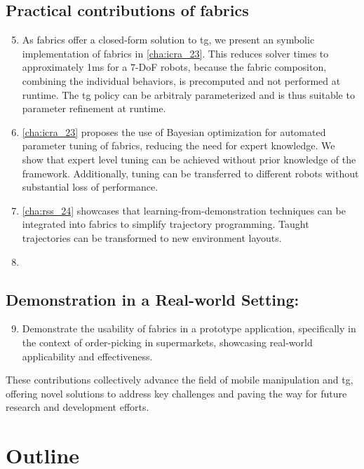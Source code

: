 \subsection{Practical contributions of \ac{fabrics}}
\begin{enumerate}
  \setcounter{enumi}{4}
  \item As \ac{fabrics} offer a closed-form solution to
    \ac{tg}, we present an symbolic implementation of
    \ac{fabrics} in \cref{cha:icra_23}. This reduces
    solver times to approximately 1ms for a 7-DoF robots, 
    because the fabric compositon, combining
    the individual behaviors, is precomputed and not
    performed at runtime. The \ac{tg} policy can be
    arbitraly parameterized and is thus suitable to
    parameter refinement at runtime.
  \item \cref{cha:icra_23} proposes the use of Bayesian optimization for
    automated parameter tuning of \ac{fabrics},
    reducing the need for expert knowledge. We show that
    expert level tuning can be achieved without prior
    knowledge of the framework. Additionally, tuning can
    be transferred to different robots without substantial
    loss of performance.
  \item \cref{cha:rss_24} showcases that learning-from-demonstration
    techniques can be integrated into \ac{fabrics} to
    simplify trajectory programming. Taught trajectories
    can be transformed to new environment layouts. 
  \item {}
\end{enumerate}

\subsection{Demonstration in a Real-world Setting:}
\begin{enumerate}
    \setcounter{enumi}{8}
    \item Demonstrate the usability of \ac{fabrics}
      in a prototype application, specifically in the
      context of order-picking in supermarkets, showcasing
      real-world applicability and effectiveness.
\end{enumerate}

These contributions collectively advance the field of mobile
manipulation and \ac{tg}, offering novel
solutions to address key challenges and paving the way for
future research and development efforts.

\section{Outline}

